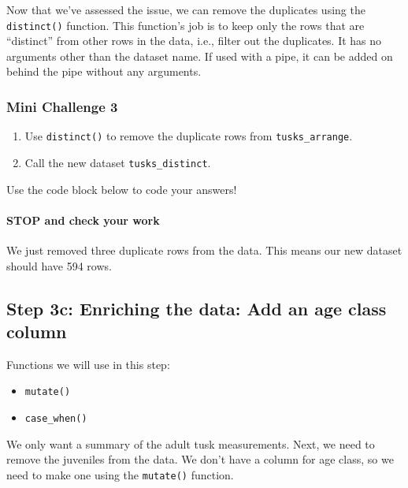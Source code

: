 \documentclass[
]{article}
\providecommand{\tightlist}{%
  \setlength{\itemsep}{0pt}\setlength{\parskip}{0pt}}
\begin{document}
Now that we've assessed the issue, we can remove the duplicates using
the \texttt{distinct()} function. This function's job is to keep only
the rows that are ``distinct'' from other rows in the data, i.e., filter
out the duplicates. It has no arguments other than the dataset name. If
used with a pipe, it can be added on behind the pipe without any
arguments.

\subsubsection{\texorpdfstring{\textbf{Mini Challenge
3}}{Mini Challenge 3}}\label{mini-challenge-3}

\begin{enumerate}
\def\labelenumi{\arabic{enumi}.}
\tightlist
\item
  Use \texttt{distinct()} to remove the duplicate rows from
  \texttt{tusks\_arrange}.
\item
  Call the new dataset \texttt{tusks\_distinct}.
\end{enumerate}

Use the code block below to code your answers!

\paragraph{\texorpdfstring{\textbf{STOP and check your
work}}{STOP and check your work}}\label{stop-and-check-your-work-1}

We just removed three duplicate rows from the data. This means our new
dataset should have 594 rows.

\subsection{\texorpdfstring{Step 3c: \textbf{Enriching the data: Add an
age class
column}}{Step 3c: Enriching the data: Add an age class column}}\label{step-3c-enriching-the-data-add-an-age-class-column}

Functions we will use in this step:

\begin{itemize}
\tightlist
\item
  \texttt{mutate()}
\item
  \texttt{case\_when()}
\end{itemize}

We only want a summary of the adult tusk measurements. Next, we need to
remove the juveniles from the data. We don't have a column for age
class, so we need to make one using the \texttt{mutate()} function.
\end{document}
